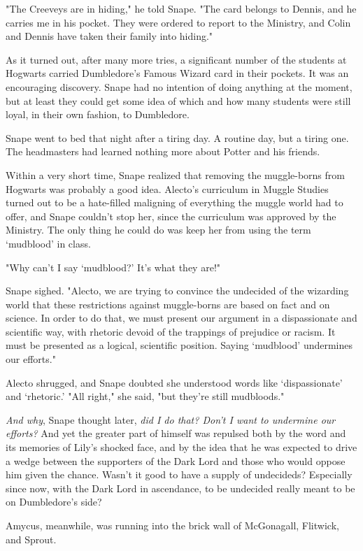 "The Creeveys are in hiding," he told Snape. "The card belongs to Dennis, and he carries me in his pocket. They were ordered to report to the Ministry, and Colin and Dennis have taken their family into hiding."

As it turned out, after many more tries, a significant number of the students at Hogwarts carried Dumbledore's Famous Wizard card in their pockets. It was an encouraging discovery. Snape had no intention of doing anything at the moment, but at least they could get some idea of which and how many students were still loyal, in their own fashion, to Dumbledore.

Snape went to bed that night after a tiring day. A routine day, but a tiring one. The headmasters had learned nothing more about Potter and his friends.

Within a very short time, Snape realized that removing the muggle-borns from Hogwarts was probably a good idea. Alecto's curriculum in Muggle Studies turned out to be a hate-filled maligning of everything the muggle world had to offer, and Snape couldn't stop her, since the curriculum was approved by the Ministry. The only thing he could do was keep her from using the term `mudblood' in class.

"Why can't I say `mudblood?' It's what they are!"

Snape sighed. "Alecto, we are trying to convince the undecided of the wizarding world that these restrictions against muggle-borns are based on fact and on science. In order to do that, we must present our argument in a dispassionate and scientific way, with rhetoric devoid of the trappings of prejudice or racism. It must be presented as a logical, scientific position. Saying `mudblood' undermines our efforts."

Alecto shrugged, and Snape doubted she understood words like `dispassionate' and `rhetoric.' "All right," she said, "but they're still mudbloods."

\emph{And why}, Snape thought later, \emph{did I do that? Don't I want to undermine our efforts?} And yet the greater part of himself was repulsed both by the word and its memories of Lily's shocked face, and by the idea that he was expected to drive a wedge between the supporters of the Dark Lord and those who would oppose him given the chance. Wasn't it good to have a supply of undecideds? Especially since now, with the Dark Lord in ascendance, to be undecided really meant to be on Dumbledore's side?

Amycus, meanwhile, was running into the brick wall of McGonagall, Flitwick, and Sprout.

